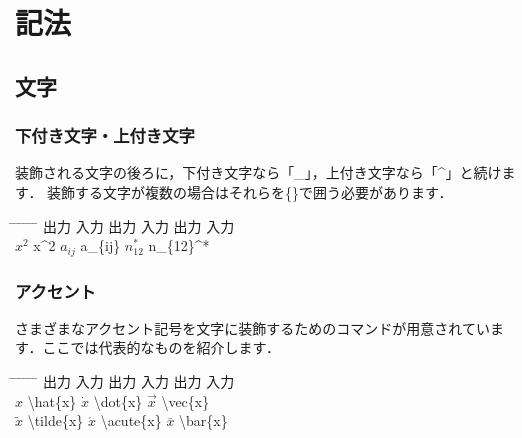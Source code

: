 \documentclass[11pt,a4j,onecolumn]{jsreport} %
\begin{document}
\section{記法}

\subsection{文字}

\subsubsection{下付き文字・上付き文字}

装飾される文字の後ろに，下付き文字なら「\_」，上付き文字なら「\^{}」と続けます．
装飾する文字が複数の場合はそれらを\{\}で囲う必要があります．

\begin{tabbing}
  \hspace{20truemm} \= \hspace{10truemm} \= \hspace{30truemm} \= \hspace{10truemm} \= \hspace{30truemm} \= \hspace{10truemm} \= \hspace{20truemm} \kill
  \> 出力 \> 入力 \> 出力 \> 入力 \> 出力 \> 入力 \\
  \> $x^2$ \> x\^{}2 \> $a_{ij}$ \> a\_\{ij\} \> $n_{12}^*$ \> n\_\{12\}\^{}* \\
\end{tabbing}

\subsubsection{アクセント}

さまざまなアクセント記号を文字に装飾するためのコマンドが用意されています．ここでは代表的なものを紹介します．

\begin{tabbing}
  \hspace{20truemm} \= \hspace{10truemm} \= \hspace{30truemm} \= \hspace{10truemm} \= \hspace{30truemm} \= \hspace{10truemm} \= \hspace{20truemm} \kill
  \> 出力 \> 入力 \> 出力 \> 入力 \> 出力 \> 入力 \\
  \> $\hat{x}$ \> \textbackslash hat\{x\} \> $\dot{x}$ \> \textbackslash dot\{x\} \> $\vec{x}$ \> \textbackslash vec\{x\} \\
  \> $\tilde{x}$ \> \textbackslash tilde\{x\} \> $\acute{x}$ \> \textbackslash acute\{x\} \> $\bar{x}$ \> \textbackslash bar\{x\} \\
\end{tabbing}
\end{document}
